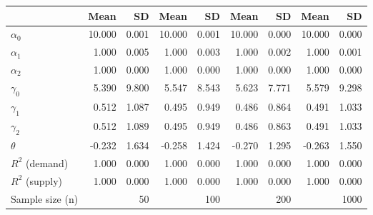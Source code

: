 
\begin{tabular}[t]{lrrrrrrrr}
\toprule
  & Mean & SD & Mean  & SD  & Mean   & SD   & Mean    & SD   \\
\midrule
$\alpha_{0}$ & 10.000 & 0.001 & 10.000 & 0.001 & 10.000 & 0.000 & 10.000 & 0.000\\
$\alpha_{1}$ & 1.000 & 0.005 & 1.000 & 0.003 & 1.000 & 0.002 & 1.000 & 0.001\\
$\alpha_{2}$ & 1.000 & 0.000 & 1.000 & 0.000 & 1.000 & 0.000 & 1.000 & 0.000\\
$\gamma_{0}$ & 5.390 & 9.800 & 5.547 & 8.543 & 5.623 & 7.771 & 5.579 & 9.298\\
$\gamma_{1}$ & 0.512 & 1.087 & 0.495 & 0.949 & 0.486 & 0.864 & 0.491 & 1.033\\
$\gamma_{2}$ & 0.512 & 1.089 & 0.495 & 0.949 & 0.486 & 0.863 & 0.491 & 1.033\\
$\theta$ & -0.232 & 1.634 & -0.258 & 1.424 & -0.270 & 1.295 & -0.263 & 1.550\\
$R^{2}$ (demand) & 1.000 & 0.000 & 1.000 & 0.000 & 1.000 & 0.000 & 1.000 & 0.000\\
$R^{2}$ (supply) & 1.000 & 0.000 & 1.000 & 0.000 & 1.000 & 0.000 & 1.000 & 0.000\\
Sample size (n) &  & 50 &  & 100 &  & 200 &  & 1000\\
\bottomrule
\end{tabular}
